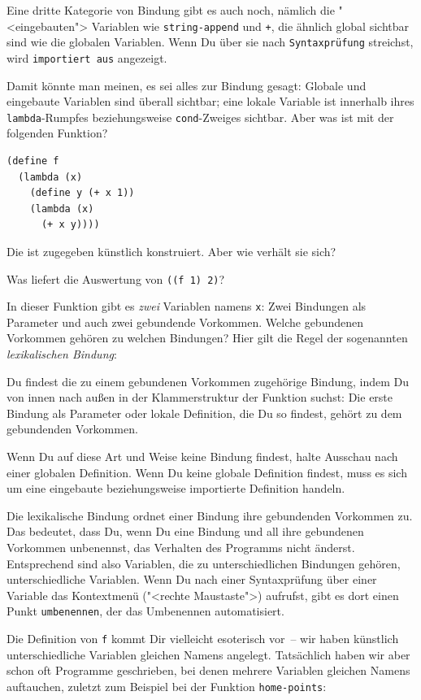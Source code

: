 Eine dritte Kategorie von Bindung gibt es auch noch, nämlich die
"<eingebauten"> Variablen wie \texttt{string-append} und
\lstinline{+}, die ähnlich global sichtbar sind wie die globalen
Variablen.  Wenn Du über sie nach \texttt{Syntaxprüfung} streichst,
wird \texttt{importiert aus} angezeigt.

Damit könnte man meinen, es sei alles zur Bindung gesagt: Globale und
eingebaute Variablen sind überall sichtbar; eine lokale Variable ist
innerhalb ihres \lstinline{lambda}-Rumpfes beziehungsweise
\lstinline{cond}-Zweiges sichtbar.  Aber was ist mit der folgenden
Funktion?
%
\begin{lstlisting}
(define f
  (lambda (x)
    (define y (+ x 1))
    (lambda (x)
      (+ x y))))
\end{lstlisting}
%
Die ist zugegeben künstlich konstruiert.  Aber wie verhält sie sich?
%
\begin{aufgabeinline}
  Was liefert die Auswertung von \lstinline{((f 1) 2)}?
\end{aufgabeinline}
%
In dieser Funktion gibt es \emph{zwei} Variablen namens \lstinline{x}:
Zwei Bindungen als Parameter und auch zwei gebundende Vorkommen.
Welche gebundenen Vorkommen gehören zu welchen Bindungen?  Hier gilt
die Regel der sogenannten \textit{lexikalischen Bindung}:
%
\begin{definition}
  Du findest die zu einem gebundenen Vorkommen zugehörige Bindung,
  indem Du von innen nach außen in der Klammerstruktur der Funktion
  suchst: Die erste Bindung als Parameter oder lokale Definition, die
  Du so findest, gehört zu dem gebundenden Vorkommen.

  Wenn Du auf diese Art und Weise keine Bindung findest, halte
  Ausschau nach einer globalen Definition.  Wenn Du keine globale
  Definition findest, muss es sich um eine eingebaute beziehungsweise
  importierte Definition handeln.
\end{definition}
%
Die lexikalische Bindung ordnet einer Bindung ihre gebundenden
Vorkommen zu.  Das bedeutet, dass Du, wenn Du eine Bindung und all
ihre gebundenen Vorkommen unbenennst, das Verhalten des Programms
nicht änderst.  Entsprechend sind also Variablen, die zu
unterschiedlichen Bindungen gehören, unterschiedliche Variablen.  Wenn
Du nach einer Syntaxprüfung über einer Variable das Kontextmenü
("<rechte Maustaste">) aufrufst, gibt es dort einen Punkt
\texttt{umbenennen}, der das Umbenennen automatisiert.

Die Definition von \lstinline{f} kommt Dir vielleicht esoterisch
vor~-- wir haben künstlich unterschiedliche Variablen gleichen Namens angelegt.
Tatsächlich haben wir aber schon oft Programme geschrieben, bei denen
mehrere Variablen gleichen Namens auftauchen, zuletzt zum Beispiel bei
der Funktion \lstinline{home-points}:

